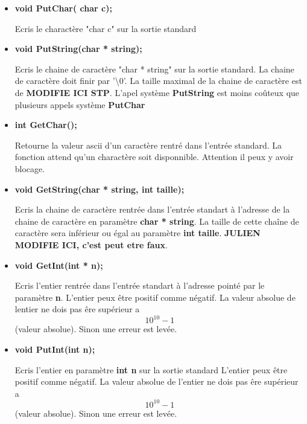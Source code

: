 \documentclass{article}
\begin{document}
\begin{itemize}
    \item 
    \textbf{void PutChar( char c);}
    
    Ecris le charactère "char c" sur la sortie standard
    
    \item 
    \textbf{void PutString(char * string);}
    
    Ecris le chaine de caractère "char * string" sur la sortie standard.
    La chaine de caractère doit finir par '\textbackslash0'.
    La taille maximal de la chaine de caractère est de 
    \textbf{ MODIFIE ICI STP}.
    L'apel système \textbf{PutString} est moins coûteux que plusieurs appels système \textbf{PutChar}
    
     \item 
    \textbf{int GetChar();}
    
    Retourne la valeur ascii d'un caractère rentré dans l'entrée standard.
    La fonction attend qu'un charactère soit disponnible. Attention il peux y avoir blocage.
    
    
     \item 
    \textbf{void GetString(char * string, int taille);}
    
    Ecris la chaine de caractère rentrée dans l'entrée standart à l'adresse de la chaine de caractère en paramètre \textbf{char * string}. La taille de cette chaîne de caractère sera inférieur ou égal au paramètre \textbf{int taille}.
    \textbf{JULIEN MODIFIE ICI, c'est peut etre faux}.
    
      \item 
    \textbf{void GetInt(int * n);}
    
    Ecris l'entier rentrée dans l'entrée standart à l'adresse pointé par le paramètre \textbf{n}.
    L'entier peux être positif comme négatif.
    La valeur absolue de lentier ne dois pas êre supérieur a \[10^{10}-1\] (valeur absolue). Sinon une erreur est levée.
    
    
    
      \item 
    \textbf{void PutInt(int n);}
    
     Ecris l'entier en paramètre \textbf{int n} sur la sortie standard
    L'entier peux être positif comme négatif.
    La valeur absolue de l'entier ne dois pas êre supérieur a \[10^{10}-1\] (valeur absolue). Sinon une erreur est levée.
    
    
\end{itemize}
\end{document}
